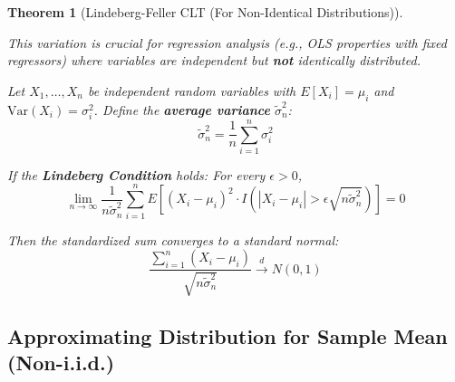\documentclass[
  letterpaper,
  DIV=11,
  numbers=noendperiod]{scrreprt}
\renewcommand{\[}{\begin{equation}}
\renewcommand{\]}{\end{equation}}
\theoremstyle{definition}
\theoremstyle{plain}
\theoremstyle{plain}
\theoremstyle{plain}
\newtheorem{theorem}{Theorem}[chapter]
\theoremstyle{definition}
\theoremstyle{plain}
\theoremstyle{remark}
\begin{document}
\begin{theorem}[Lindeberg-Feller CLT (For Non-Identical
Distributions)]\protect\hypertarget{thm-lindeberg-feller}{}\label{thm-lindeberg-feller}

This variation is crucial for regression analysis (e.g., OLS properties
with fixed regressors) where variables are independent but \textbf{not}
identically distributed.

Let \(X_1, \dots, X_n\) be independent random variables with
\(E[X_i] = \mu_i\) and \(\text{Var}(X_i) = \sigma_i^2\). Define the
\textbf{average variance} \(\tilde{\sigma}_n^2\): \[
\tilde{\sigma}_n^2 = \frac{1}{n} \sum_{i=1}^n \sigma_i^2
\]

If the \textbf{Lindeberg Condition} holds: For every \(\epsilon > 0\),
\[
\lim_{n \to \infty} \frac{1}{n \tilde{\sigma}_n^2} \sum_{i=1}^n E\left[ (X_i - \mu_i)^2 \cdot I\left( |X_i - \mu_i| > \epsilon \sqrt{n \tilde{\sigma}_n^2} \right) \right] = 0
\]

Then the standardized sum converges to a standard normal: \[
\frac{\sum_{i=1}^n (X_i - \mu_i)}{\sqrt{n \tilde{\sigma}_n^2}} \xrightarrow{d} N(0, 1)
\]

\end{theorem}

\subsection{Approximating Distribution for Sample Mean
(Non-i.i.d.)}\label{approximating-distribution-for-sample-mean-non-i.i.d.}
\end{document}
